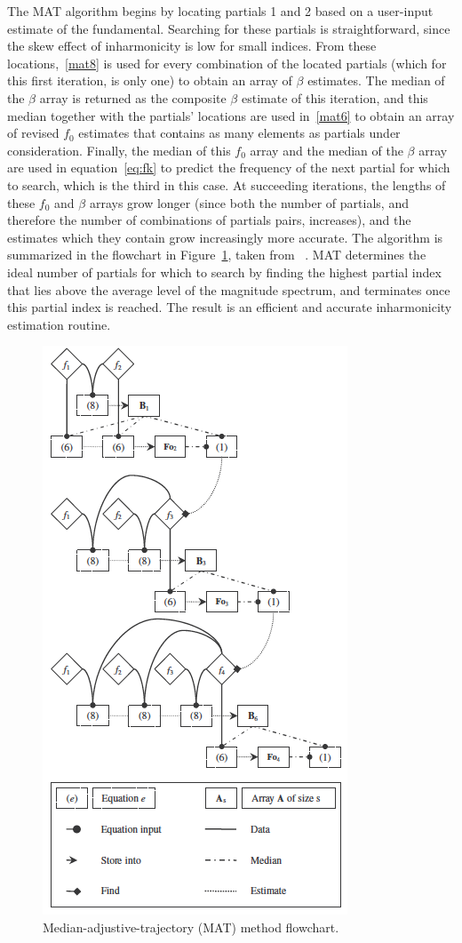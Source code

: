 \documentclass[12pt]{cmuthesis}
\begin{document}
The MAT algorithm begins by locating partials 1 and 2 based on a user-input estimate of the fundamental. Searching for these partials is straightforward, since the skew effect of inharmonicity is low for small indices. From these locations,~\eqref{mat8} is used for every combination of the located partials (which for this first iteration, is only one) to obtain an array of $\beta$ estimates. The median of the $\beta$ array is returned as the composite $\beta$ estimate of this iteration, and this median together with the partials' locations are used in~\eqref{mat6} to obtain an array of revised $f_0$ estimates that contains as many elements as partials under consideration. Finally, the median of this $f_0$ array and the median of the $\beta$ array are used in equation~\eqref{eq:fk} to predict the frequency of the next partial for which to search, which is the third in this case. At succeeding iterations, the lengths of these $f_0$ and $\beta$ arrays grow longer (since both the number of partials, and therefore the number of combinations of partials pairs, increases), and the estimates which they contain grow increasingly more accurate. The algorithm is summarized in the flowchart in Figure~\ref{fig:mat-flowchart}, taken from ~\cite{hodgkinson2009}. MAT determines the ideal number of partials for which to search by finding the highest partial index that lies above the average level of the magnitude spectrum, and terminates once this partial index is reached. The result is an efficient and accurate inharmonicity estimation routine. 
\begin{figure}[!htbp] 
\label{fig:mat-flowchart}
\centering
\includegraphics[scale=0.9]{mat-flowchart}
\caption{Median-adjustive-trajectory (MAT) method flowchart.}
\end{figure}
\end{document}
